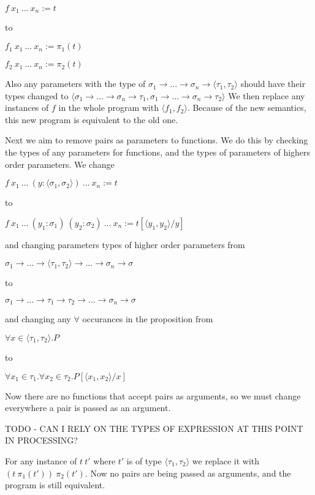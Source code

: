 \documentclass[12pt,a4paper,titlepage]{article}
\begin{document}
    $f\ x_1\ ...\ x_n := t$

    to

    $f_1\ x_1\ ...\ x_n := \pi_1(t)$

    $f_2\ x_1\ ...\ x_n := \pi_2(t)$

    Also any parameters with the type of
    $\sigma_1 \rightarrow ... \rightarrow \sigma_n \rightarrow \langle \tau_1, \tau_2 \rangle$
    should have their types changed to
    $\langle \sigma_1 \rightarrow ... \rightarrow \sigma_n \rightarrow \tau_1, \sigma_1 \rightarrow ... \rightarrow \sigma_n \rightarrow \tau_2 \rangle$
    We then replace any instances of $f$ in the whole program with $\langle f_1, f_2 \rangle$.
    Because of the new semantics, this new program is equivalent to the old one.

    Next we aim to remove pairs as parameters to functions. We do this by checking the types of any parameters
    for functions, and the types of parameters of highers order parameters. We change

    $f\ x_1\ ...\ (y: \langle \sigma_1, \sigma_2 \rangle)\ ...\ x_n := t$

    to

    $f\ x_1\ ...\ (y_1: \sigma_1)\ (y_2: \sigma_2)\ ...\ x_n := t[\langle y_1, y_2 \rangle / y]$

    and changing parameters types of higher order parameters from

    $\sigma_1 \rightarrow ... \rightarrow \langle \tau_1, \tau_2 \rangle \rightarrow ... \rightarrow \sigma_n \rightarrow \sigma$

    to

    $\sigma_1 \rightarrow ... \rightarrow \tau_1 \rightarrow \tau_2 \rightarrow ... \rightarrow \sigma_n \rightarrow \sigma$

    and changing any $\forall$ occurances in the proposition from

    $\forall x \in \langle \tau_1, \tau_2 \rangle . P$

    to

    $\forall x_1 \in \tau_1 . \forall x_2 \in \tau_2 . P[\langle x_1, x_2 \rangle / x]$

    Now there are no functions that accept pairs as arguments, so we must change everywhere a pair is passed as
    an argument.

    TODO - CAN I RELY ON THE TYPES OF EXPRESSION AT THIS POINT IN PROCESSING?

    For any instance of $t\ t'$ where $t'$ is of type $\langle \tau_1, \tau_2 \rangle$ we replace it with
    $(t\ \pi_1(t'))\ \pi_2(t')$.
    Now no pairs are being passed as arguments, and the program is still equivalent.
\end{document}
